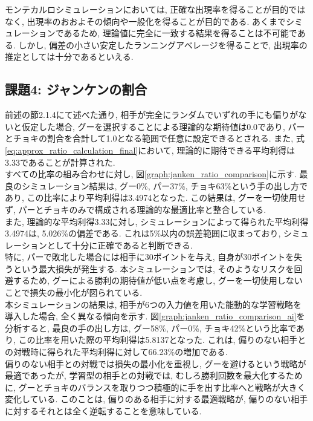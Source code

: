 \documentclass[a4j, 12pt ]{jarticle}
\begin{document}
モンテカルロシミュレーションにおいては, 正確な出現率を得ることが目的ではなく, 出現率のおおよその傾向や一般化を得ることが目的である. あくまでシミュレーションであるため, 理論値に完全に一致する結果を得ることは不可能である. しかし, 偏差の小さい安定したランニングアベレージを得ることで, 出現率の推定としては十分であるといえる.\\

\subsection{課題4: ジャンケンの割合}
前述の節2.1.4にて述べた通り, 相手が完全にランダムでいずれの手にも偏りがないと仮定した場合, グーを選択することによる理論的な期待値は0.0であり, パーとチョキの割合を合計して1.0となる範囲で任意に設定できるとされる. また, 式\ref{eq:approx_ratio_calculation_final}において, 理論的に期待できる平均利得は3.33であることが計算された.\\

すべての比率の組み合わせに対し, 図\ref{graph:janken_ratio_comparison}に示す. 最良のシミュレーション結果は, グー0\%, パー37\%, チョキ63\%という手の出し方であり, この比率により平均利得は3.4974となった. この結果は, グーを一切使用せず, パーとチョキのみで構成される理論的な最適比率と整合している.\\

また, 理論的な平均利得3.33に対し, シミュレーションによって得られた平均利得3.4974は, 5.026\%の偏差である. これは5\%以内の誤差範囲に収まっており, シミュレーションとして十分に正確であると判断できる.\\

特に, パーで敗北した場合には相手に30ポイントを与え, 自身が30ポイントを失うという最大損失が発生する. 本シミュレーションでは, そのようなリスクを回避するため, グーによる勝利の期待値が低い点を考慮し, グーを一切使用しないことで損失の最小化が図られている.\\

本シミュレーションの結果は, 相手が6つの入力値を用いた能動的な学習戦略を導入した場合, 全く異なる傾向を示す. 図\ref{graph:janken_ratio_comparison_ai}を分析すると, 最良の手の出し方は, グー58\%, パー0\%, チョキ42\%という比率であり, この比率を用いた際の平均利得は5.8137となった. これは, 偏りのない相手との対戦時に得られた平均利得に対して66.23\%の増加である.\\

偏りのない相手との対戦では損失の最小化を重視し, グーを避けるという戦略が最適であったが, 学習型の相手との対戦では, むしろ勝利回数を最大化するために, グーとチョキのバランスを取りつつ積極的に手を出す比率へと戦略が大きく変化している. このことは, 偏りのある相手に対する最適戦略が, 偏りのない相手に対するそれとは全く逆転することを意味している.\\
\end{document}
